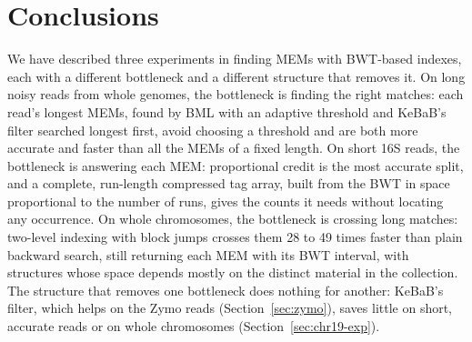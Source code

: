 \section{Conclusions}
\label{sec:conclusions}
\label{sec:conclusion}

We have described three experiments in finding MEMs with BWT-based indexes, each with a different bottleneck and a different structure that removes it.
On long noisy reads from whole genomes, the bottleneck is finding the right matches: each read's longest MEMs, found by BML with an adaptive threshold and KeBaB's filter searched longest first, avoid choosing a threshold and are both more accurate and faster than all the MEMs of a fixed length.
On short 16S reads, the bottleneck is answering each MEM: proportional credit is the most accurate split, and a complete, run-length compressed tag array, built from the BWT in space proportional to the number of runs, gives the counts it needs without locating any occurrence.
On whole chromosomes, the bottleneck is crossing long matches: two-level indexing with block jumps crosses them 28 to 49 times faster than plain backward search, still returning each MEM with its BWT interval, with structures whose space depends mostly on the distinct material in the collection.
The structure that removes one bottleneck does nothing for another: KeBaB's filter, which helps on the Zymo reads (Section~\ref{sec:zymo}), saves little on short, accurate reads or on whole chromosomes (Section~\ref{sec:chr19-exp}).

